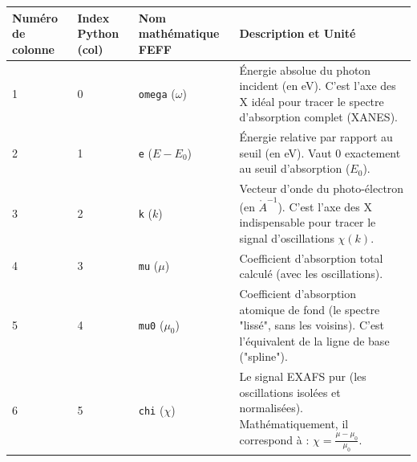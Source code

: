 \documentclass[12pt,a4paper,french]{book}
\begin{document}
\begin{tabular}{||p{1.3cm}|p{1.3cm}|p{2cm}|p{12cm}||}
	\hline	\hline
	Numéro de colonne&	Index Python (col)&	Nom mathématique FEFF	& Description et Unité\\
	\hline	\hline
	1&0& \verb+omega+ ($\omega$) & Énergie absolue du photon incident (en eV). C'est l'axe des X idéal pour tracer le spectre d'absorption complet (XANES).\\
		\hline
	2&1& \verb+e+ ($E-E_0$) &  Énergie relative par rapport au seuil (en eV). Vaut $0$ exactement au seuil d'absorption ($E_0$).\\
		\hline
	3&2& \verb+k+ ($k$) & Vecteur d'onde du photo-électron (en $\mathring{A}^{-1}$). C'est l'axe des X indispensable pour tracer le signal d'oscillations $\chi(k)$.\\
		\hline
	4&3& \verb+mu+ ($\mu$) & Coefficient d'absorption total calculé (avec les oscillations).\\
		\hline
	5&4& \verb+mu0+ ($\mu_0$) & Coefficient d'absorption atomique de fond (le spectre "lissé", sans les voisins). C'est l'équivalent de la ligne de base ("spline").\\
		\hline
	6&5& \verb+chi+ ($\chi$) & Le signal EXAFS pur (les oscillations isolées et normalisées). Mathématiquement, il correspond à : $\chi = \frac{\mu - \mu_0}{\mu_0}$.\\
		\hline
	\hline
\end{tabular}

\appendix
\end{document}
